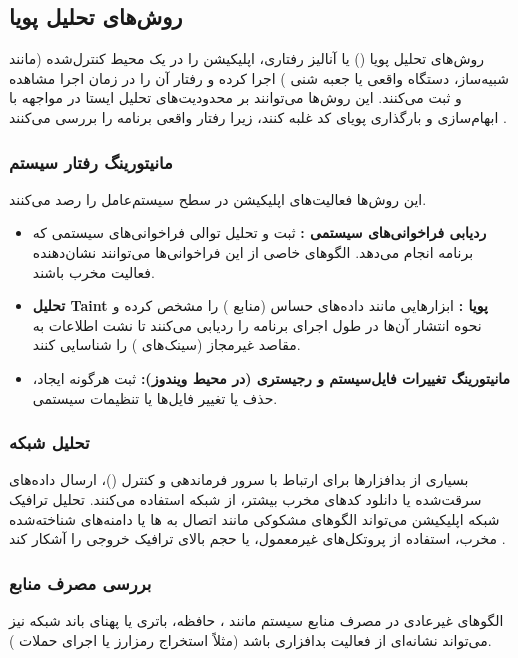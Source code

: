 \subsection{روش‌های تحلیل پویا}
روش‌های تحلیل پویا () یا آنالیز رفتاری، اپلیکیشن را در یک محیط کنترل‌شده (مانند شبیه‌ساز، دستگاه واقعی یا جعبه شنی ) اجرا کرده و رفتار آن را در زمان اجرا مشاهده و ثبت می‌کنند. این روش‌ها می‌توانند بر محدودیت‌های تحلیل ایستا در مواجهه با ابهام‌سازی و بارگذاری پویای کد غلبه کنند، زیرا رفتار واقعی برنامه را بررسی می‌کنند \cite{AndroidMalwareSurvey}.

\subsubsection{مانیتورینگ رفتار سیستم}
این روش‌ها فعالیت‌های اپلیکیشن در سطح سیستم‌عامل را رصد می‌کنند.
\begin{itemize}
    \item \textbf{ردیابی فراخوانی‌های سیستمی :} ثبت و تحلیل توالی فراخوانی‌های سیستمی که برنامه انجام می‌دهد. الگوهای خاصی از این فراخوانی‌ها می‌توانند نشان‌دهنده فعالیت مخرب باشند.
    \item \textbf{تحلیل Taint پویا :} ابزارهایی مانند  \cite{TaintDroid} داده‌های حساس (منابع ) را مشخص کرده و نحوه انتشار آن‌ها در طول اجرای برنامه را ردیابی می‌کنند تا نشت اطلاعات به مقاصد غیرمجاز (سینک‌های ) را شناسایی کنند.
    \item \textbf{مانیتورینگ تغییرات فایل‌سیستم و رجیستری (در محیط ویندوز):} ثبت هرگونه ایجاد، حذف یا تغییر فایل‌ها یا تنظیمات سیستمی.
\end{itemize}

\subsubsection{تحلیل شبکه}
بسیاری از بدافزارها برای ارتباط با سرور فرماندهی و کنترل ()، ارسال داده‌های سرقت‌شده یا دانلود کدهای مخرب بیشتر، از شبکه استفاده می‌کنند. تحلیل ترافیک شبکه اپلیکیشن می‌تواند الگوهای مشکوکی مانند اتصال به ها یا دامنه‌های شناخته‌شده مخرب، استفاده از پروتکل‌های غیرمعمول، یا حجم بالای ترافیک خروجی را آشکار کند \cite{NetworkAnalysis}.

\subsubsection{بررسی مصرف منابع}
الگوهای غیرعادی در مصرف منابع سیستم مانند ، حافظه، باتری یا پهنای باند شبکه نیز می‌تواند نشانه‌ای از فعالیت بدافزاری باشد (مثلاً استخراج رمزارز یا اجرای حملات ).

